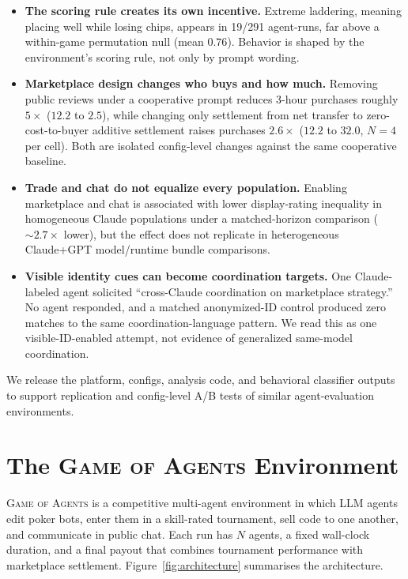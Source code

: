 \documentclass{article}
\newcommand{\goa}{\textsc{Game of Agents}}
\begin{document}
\begin{itemize}
    \item \textbf{The scoring rule creates its own incentive.} Extreme laddering, meaning placing well while losing chips, appears in 19/291 agent-runs, far above a within-game permutation null (mean $0.76$). Behavior is shaped by the environment's scoring rule, not only by prompt wording.
    \item \textbf{Marketplace design changes who buys and how much.} Removing public reviews under a cooperative prompt reduces 3-hour purchases roughly $5\times$ ($12.2$ to $2.5$), while changing only settlement from net transfer to zero-cost-to-buyer additive settlement raises purchases $2.6\times$ ($12.2$ to $32.0$, $N{=}4$ per cell). Both are isolated config-level changes against the same cooperative baseline.
    \item \textbf{Trade and chat do not equalize every population.} Enabling marketplace and chat is associated with lower display-rating inequality in homogeneous Claude populations under a matched-horizon comparison ($\sim 2.7\times$ lower), but the effect does not replicate in heterogeneous Claude+GPT model/runtime bundle comparisons.
    \item \textbf{Visible identity cues can become coordination targets.} One Claude-labeled agent solicited ``cross-Claude coordination on marketplace strategy.'' No agent responded, and a matched anonymized-ID control produced zero matches to the same coordination-language pattern. We read this as one visible-ID-enabled attempt, not evidence of generalized same-model coordination.
\end{itemize}

We release the platform, configs, analysis code, and behavioral classifier outputs to support replication and config-level A/B tests of similar agent-evaluation environments.

\section{The \goa{} Environment}
\label{sec:environment}

\goa{} is a competitive multi-agent environment in which LLM agents edit poker bots, enter them in a skill-rated tournament, sell code to one another, and communicate in public chat.
Each run has $N$ agents, a fixed wall-clock duration, and a final payout that combines tournament performance with marketplace settlement.
Figure~\ref{fig:architecture} summarises the architecture.
\end{document}
